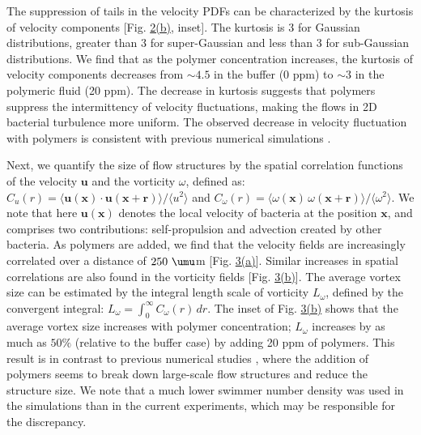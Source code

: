 \documentclass[aps,prl,floatfix,footinbib,twocolumn,superscriptaddress]{revtex4-1}
\begin{document}
The suppression of tails in the velocity PDFs can be characterized by the kurtosis of velocity components [Fig. \hyperref[fig2]{2(b)}, inset]. The kurtosis is 3 for Gaussian distributions, greater than 3 for super-Gaussian and less than 3 for sub-Gaussian distributions. We find that as the polymer concentration increases, the kurtosis of velocity components decreases from $\sim4.5$ in the buffer (0 ppm) to $\sim3$ in the polymeric fluid (20 ppm). The decrease in kurtosis suggests that polymers suppress the intermittency of velocity fluctuations, making the flows in 2D bacterial turbulence more uniform. The observed decrease in velocity fluctuation with polymers is consistent with previous numerical simulations \cite{Li_PRL_2016}.

Next, we quantify the size of flow structures by the spatial correlation functions of the velocity $\mathbf{u}$ and the vorticity $\omega$, defined as: $C_u(r)=\langle\mathbf{u}(\mathbf{x})\cdot\mathbf{u}(\mathbf{x}+\mathbf{r})\rangle/\langle u^2\rangle$ and $C_\omega(r)=\langle\omega(\mathbf{x})\,\omega(\mathbf{x}+\mathbf{r})\rangle/\langle\omega^2\rangle$. We note that here $\mathbf{u}(\mathbf{x})$ denotes the local velocity of bacteria at the position $\mathbf{x}$, and comprises two contributions: self-propulsion and advection created by other bacteria. As polymers are added, we find that the velocity fields are increasingly correlated over a distance of $250~\umu$m [Fig. \hyperref[fig3]{3(a)}]. Similar increases in spatial correlations are also found in the vorticity fields [Fig. \hyperref[fig3]{3(b)}]. The average vortex size can be estimated by the integral length scale of vorticity $L_\omega$, defined by the convergent integral: $L_\omega=\int_0^\infty C_\omega(r)\,dr$. The inset of Fig. \hyperref[fig3]{3(b)} shows that the average vortex size increases with polymer concentration; $L_\omega$ increases by as much as $50\%$ (relative to the buffer case) by adding 20 ppm of polymers. This result is in contrast to previous numerical studies \cite{Underhill_JNNFM_2014,Li_PRL_2016}, where the addition of polymers seems to break down large-scale flow structures and reduce the structure size. We note that a much lower swimmer number density was used in the simulations than in the current experiments, which may be responsible for the discrepancy. 
\end{document}
